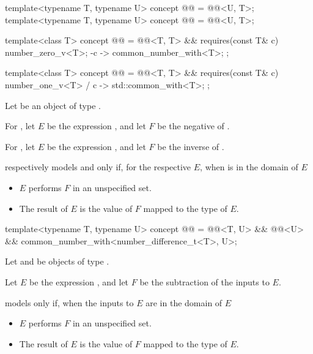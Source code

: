 \begin{itemdecl}
template<typename T, typename U>
concept @@ = @@<U, T>;
template<typename T, typename U>
concept @@ = @@<U, T>;
\end{itemdecl}

\begin{itemdecl}
template<class T> concept @@ =
  @@<T, T> &&
  requires(const T& c) {
    number_zero_v<T>;
    { -c } -> common_number_with<T>;
  };

template<class T> concept @@ =
  @@<T, T> &&
  requires(const T& c) {
    { number_one_v<T> / c } -> std::common_with<T>;
  };
\end{itemdecl}

\begin{itemdescr}
\pnum
Let  be an object of type .

\pnum
For ,
let $E$ be the expression , and
let $F$ be the negative of .

\pnum
For ,
let $E$ be the expression , and
let $F$ be the inverse of .

\pnum
{} respectively models
 and
only if, for the respective $E$, when  is in the domain of $E$
\begin{itemize}
\item
$E$ performs $F$ in an unspecified set.
\item
The result of $E$ is the value of $F$ mapped to the type of $E$.
\end{itemize}
\end{itemdescr}

\begin{itemdecl}
template<typename T, typename U>
concept @@ =
  @@<T, U> && @@<U> && common_number_with<number_difference_t<T>, U>;
\end{itemdecl}

\begin{itemdescr}
\pnum
Let  and  be objects of type .

\pnum
Let $E$ be the expression , and
let $F$ be the subtraction of the inputs to $E$.

\pnum
{} models  only if,
when the inputs to $E$ are in the domain of $E$
\begin{itemize}
\item
$E$ performs $F$ in an unspecified set.
\item
The result of $E$ is the value of $F$ mapped to the type of $E$.
\end{itemize}
\end{itemdescr}

